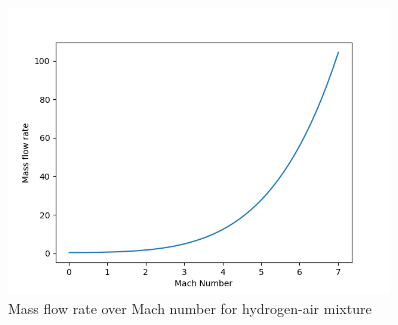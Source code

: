 \documentclass[a4paper,11pt]{article}
\begin{document}
	\begin{figure}[H]
		\centering
		\includegraphics[width=0.9\textwidth]{H2_pow(1mol)/Mass_flow_rate_over_Mach.png}
       		\caption{Mass flow rate over Mach number for hydrogen-air mixture}
	\end{figure}
\end{document}
